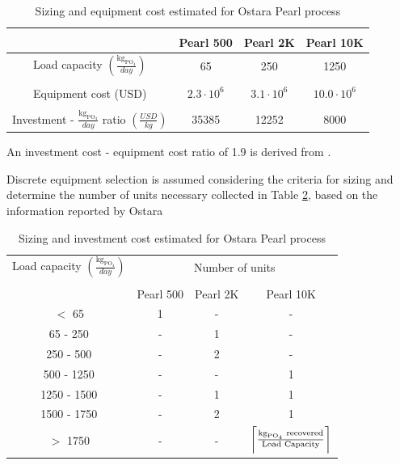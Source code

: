 \documentclass[10pt,a4paper]{article}
\DeclarePairedDelimiter{\ceil}{\lceil}{\rceil}
\begin{document}
\begin{table}[H] 
	\begin{adjustwidth}{}{}
		\centering
		\caption{Sizing and equipment cost estimated for Ostara Pearl process} \label{table:ostara_costs}
		\begin{tabular}{c c c c}
			\toprule
			& Pearl\textsuperscript{\textregistered} 500 & Pearl\textsuperscript{\textregistered} 2K	& Pearl\textsuperscript{\textregistered} 10K	\\ \midrule
			Load capacity $\left(\frac{\text{kg}_{\text{PO}_\text{4}}}{day}\right)$ & 65 & 250 & 1250 	\\ \\
			Equipment cost (USD)	& $2.3 \cdot 10^{6}$ & $3.1 \cdot 10^{6}$  & $10.0 \cdot 10^{6}$  	\\ \\
			Investment - $\frac{\text{kg}_{\text{PO}_\text{4}}}{day}$ ratio $\left(\frac{USD}{kg}\right)$	& 35385 & 12252 & 8000  \\ 
			\bottomrule 
		\end{tabular}
	\end{adjustwidth}
\end{table}

An investment cost - equipment cost ratio of 1.9 is derived from \cite{Pearl2Kcost2}.

Discrete equipment selection is assumed considering the criteria for sizing and determine the number of units necessary collected in Table \ref{table:ostara_units}, based on the information reported by Ostara \cite{Ostara}

\begin{table}[H] 
	\begin{adjustwidth}{}{}
		\centering
		\caption{Sizing and investment cost estimated for Ostara Pearl process} \label{table:ostara_units}
		\begin{tabular}{c c c c}
			\toprule
			\multicolumn{1}{c}{Load capacity $\left(\frac{\text{kg}_{\text{PO}_\text{4}}}{day}\right)$}&\multicolumn{3}{c}{Number of units}\\
			\cmidrule(lr){2-4}
			 & Pearl\textsuperscript{\textregistered} 500 & Pearl\textsuperscript{\textregistered} 2K	& Pearl\textsuperscript{\textregistered} 10K	\\ \midrule
			$<$ 65 		& \cellcolor{blue!25}1 	& - 					& - 	\\
			65 - 250 	& -						& \cellcolor{blue!25}1 	& -  	\\
			250 - 500 	& -						& \cellcolor{blue!25}2 	& -  	\\
			500 - 1250 	& -						& -					 	& \cellcolor{blue!25}1  	\\ 
			1250 - 1500 & -						& \cellcolor{blue!25}1 	& \cellcolor{blue!25}1  	\\ 
			1500 - 1750 & -						& \cellcolor{blue!25}2 	& \cellcolor{blue!25}1	 	\\ 
			$>$ 1750 	&-						& -					 	& \cellcolor{blue!25}$\ceil[\bigg]{\frac{\text{kg}_{\text{PO}_\text{4}} \text{ recovered}}{\text{Load Capacity}}}$  	\\
		\end{tabular}
	\end{adjustwidth}
\end{table}
\end{document}
